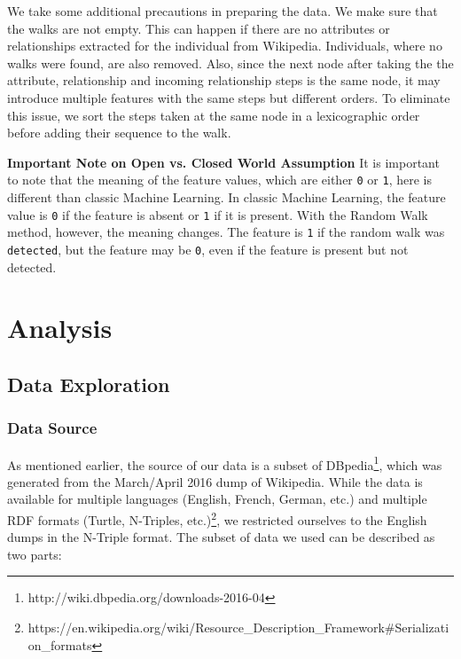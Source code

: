 \documentclass[runningheads,a4paper]{IEEEtran}
\begin{document}
We take some additional precautions in preparing the data. We make sure that the walks are not empty. This can happen if there are no attributes or relationships extracted for the individual from Wikipedia. Individuals, where no walks were found, are also removed. Also, since the next node after taking the the attribute, relationship and incoming relationship steps is the same node, it may introduce multiple features with the same steps but different orders. To eliminate this issue, we sort the steps taken at the same node in a lexicographic order before adding their sequence to the walk.
 
\textbf{Important Note on Open vs. Closed World Assumption}
It is important to note that the meaning of the feature values, which are either \texttt{0} or \texttt{1}, here is different than classic Machine Learning. In classic Machine Learning, the feature value is \texttt{0} if the feature is absent or \texttt{1} if it is present. With the Random Walk method, however, the meaning changes. The feature is \texttt{1} if the random walk was \texttt{detected}, but the feature may be \texttt{0}, even if the feature is present but not detected. 

\section{Analysis}

\subsection{Data Exploration}
\subsubsection{Data Source}
As mentioned earlier, the source of our data is a subset of DBpedia\footnote{http://wiki.dbpedia.org/downloads-2016-04}, which was generated from the March/April 2016 dump of Wikipedia. While the data is available for multiple languages (English, French, German, etc.) and multiple RDF formats (Turtle, N-Triples, etc.)\footnote{https://en.wikipedia.org/wiki/Resource\_Description\_Framework\#Serialization\_formats}, we restricted ourselves to the English dumps in the N-Triple format. The subset of data we used can be described as two parts:
\end{document}
